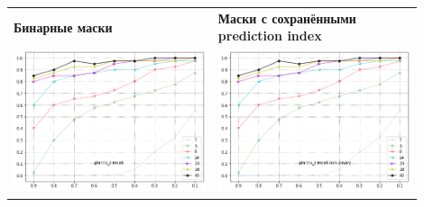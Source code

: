\documentclass{article}
\begin{document}
\begin{enumerate}
    \begin{table}[h!]
        \begin{tabular}{p{0.45\linewidth}p{0.45\linewidth}}
            \textbf{Бинарные маски} & \textbf{Маски с сохранёнными prediction index}\\
            \includegraphics[width=\linewidth]{p} & \includegraphics[width=\linewidth]{p_non_binary}\\ 

\end{tabular}
\end{table}
\end{enumerate}
\end{document}
